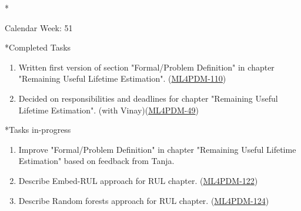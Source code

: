 \documentclass[11pt,a4paper]{article}
\begin{document}
\newpage
\begin{section}*{Calendar Week: 51 \hfill \date{18 December, 2020}}
 \begin{refsection}

   \begin{subsection}*{Completed Tasks}
     \begin{enumerate}
       \item
             Written first version of section "Formal/Problem Definition" in chapter "Remaining Useful Lifetime Estimation". (\href{https://ml4pdm.atlassian.net/browse/ML4PDM-110}{ML4PDM-110})
       \item
             Decided on responsibilities and deadlines for chapter "Remaining Useful Lifetime Estimation". (with Vinay)(\href{https://ml4pdm.atlassian.net/browse/ML4PDM-49}{ML4PDM-49})
     \end{enumerate}
   \end{subsection}

   \begin{subsection}*{Tasks in-progress}
     \begin{enumerate}
       \item
             Improve "Formal/Problem Definition" in chapter "Remaining Useful Lifetime Estimation" based on feedback from Tanja.
       \item
             Describe Embed-RUL approach \cite{DBLP:journals/corr/abs-1709-01073} for RUL chapter. (\href{https://ml4pdm.atlassian.net/browse/ML4PDM-122}{ML4PDM-122})
       \item
             Describe Random forests approach \cite{GSCH:jennings2016forecasting, GSCH:cutler2012random} for RUL chapter. (\href{https://ml4pdm.atlassian.net/browse/ML4PDM-124}{ML4PDM-124})
     \end{enumerate}
   \end{subsection}

   \printbibliography
 \end{refsection}
\end{section}
\end{document}
